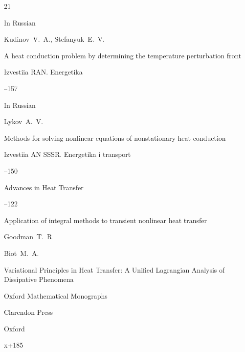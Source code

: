 \begin{thebibliography}{21}






\lang In Russian

\by Kudinov~V.~A., Stefanyuk~E.~V.

\paper A heat conduction problem by determining the temperature perturbation front

\jour Izvestiia RAN. Energetika



--157




\lang In Russian

\by Lykov~A.~V.

\paper Methods for solving nonlinear equations of nonstationary heat conduction

\jour Izvestiia AN SSSR. Energetika i transport



--150






\jour Advances in Heat Transfer



–122

\paper Application of integral methods to transient nonlinear heat transfer

\by Goodman~T.~R







\by Biot~M.~A.

\book Variational Principles in Heat Transfer: A Unified Lagrangian Analysis of Dissipative Phenomena

\serial Oxford Mathematical Monographs

\publ Clarendon Press

\publaddr Oxford 


\totalpages x+185


\end{thebibliography}

